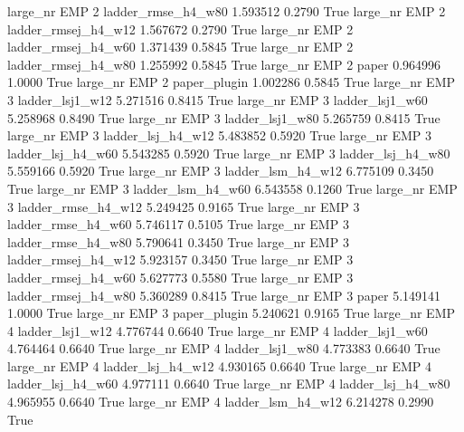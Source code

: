   large_nr      EMP                 2  ladder_rmse_h4_w80    1.593512      0.2790    True
  large_nr      EMP                 2 ladder_rmsej_h4_w12    1.567672      0.2790    True
  large_nr      EMP                 2 ladder_rmsej_h4_w60    1.371439      0.5845    True
  large_nr      EMP                 2 ladder_rmsej_h4_w80    1.255992      0.5845    True
  large_nr      EMP                 2               paper    0.964996      1.0000    True
  large_nr      EMP                 2        paper_plugin    1.002286      0.5845    True
  large_nr      EMP                 3     ladder_lsj1_w12    5.271516      0.8415    True
  large_nr      EMP                 3     ladder_lsj1_w60    5.258968      0.8490    True
  large_nr      EMP                 3     ladder_lsj1_w80    5.265759      0.8415    True
  large_nr      EMP                 3   ladder_lsj_h4_w12    5.483852      0.5920    True
  large_nr      EMP                 3   ladder_lsj_h4_w60    5.543285      0.5920    True
  large_nr      EMP                 3   ladder_lsj_h4_w80    5.559166      0.5920    True
  large_nr      EMP                 3   ladder_lsm_h4_w12    6.775109      0.3450    True
  large_nr      EMP                 3   ladder_lsm_h4_w60    6.543558      0.1260    True
  large_nr      EMP                 3  ladder_rmse_h4_w12    5.249425      0.9165    True
  large_nr      EMP                 3  ladder_rmse_h4_w60    5.746117      0.5105    True
  large_nr      EMP                 3  ladder_rmse_h4_w80    5.790641      0.3450    True
  large_nr      EMP                 3 ladder_rmsej_h4_w12    5.923157      0.3450    True
  large_nr      EMP                 3 ladder_rmsej_h4_w60    5.627773      0.5580    True
  large_nr      EMP                 3 ladder_rmsej_h4_w80    5.360289      0.8415    True
  large_nr      EMP                 3               paper    5.149141      1.0000    True
  large_nr      EMP                 3        paper_plugin    5.240621      0.9165    True
  large_nr      EMP                 4     ladder_lsj1_w12    4.776744      0.6640    True
  large_nr      EMP                 4     ladder_lsj1_w60    4.764464      0.6640    True
  large_nr      EMP                 4     ladder_lsj1_w80    4.773383      0.6640    True
  large_nr      EMP                 4   ladder_lsj_h4_w12    4.930165      0.6640    True
  large_nr      EMP                 4   ladder_lsj_h4_w60    4.977111      0.6640    True
  large_nr      EMP                 4   ladder_lsj_h4_w80    4.965955      0.6640    True
  large_nr      EMP                 4   ladder_lsm_h4_w12    6.214278      0.2990    True
